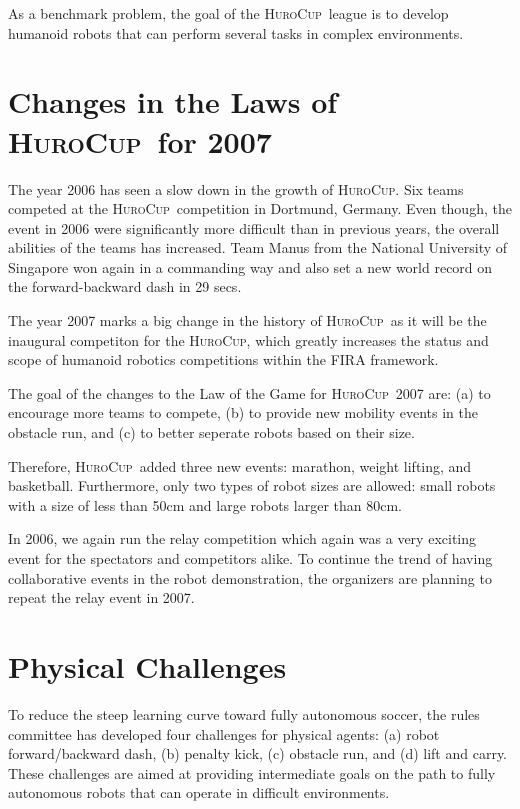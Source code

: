 \documentclass[12pt]{article}
\newcommand{\HuroCup}{\textsc{HuroCup}}
\begin{document}
As a benchmark problem, the goal of the \HuroCup\ league is to develop
humanoid robots that can perform several tasks in complex environments.

\section{Changes in the Laws of \HuroCup\ for 2007}

The year 2006 has seen a slow down in the growth of \HuroCup. Six teams
competed at the \HuroCup\ competition in Dortmund, Germany. Even though,
the event in 2006 were significantly more difficult than in
previous years, the overall abilities of the teams has increased. Team
Manus from the National University of Singapore won again in a
commanding way and also set a new world record on the forward-backward
dash in 29 secs.

The year 2007 marks a big change in the history of \HuroCup\ as it will
be the inaugural competiton for the \HuroCup, which greatly increases
the status and scope of humanoid robotics competitions within the FIRA
framework.

The goal of the changes to the Law of the Game for \HuroCup\ 2007 are:
(a) to encourage more teams to compete, (b) to provide new mobility
events in the obstacle run, and (c) to better seperate robots
based on their size.

Therefore, \HuroCup\ added three new events: marathon, weight lifting,
and basketball. Furthermore, only two types of robot sizes are
allowed: small robots with a size of less than 50cm and large robots
larger than 80cm.

In 2006, we again run the relay competition which again was a very
exciting event for the spectators and competitors alike. To continue
the trend of having collaborative events in the robot demonstration,
the organizers are planning to repeat the relay event in 2007.

\section{Physical Challenges}    
\label{sec:physical-challenges}

To reduce the steep learning curve toward fully autonomous soccer, the
rules committee has developed four challenges for physical agents: (a)
robot forward/backward dash, (b) penalty kick, (c) obstacle run, and
(d) lift and carry. These challenges are aimed at providing
intermediate goals on the path to fully autonomous robots that can
operate in difficult environments.
\end{document}
